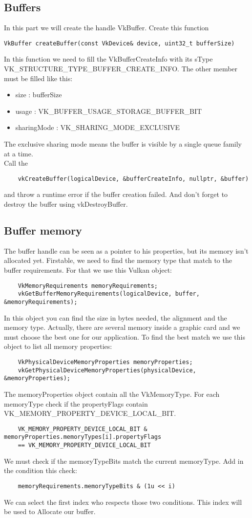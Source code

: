 \documentclass{article}
\begin{document}
\subsection{Buffers}
In this part we will create the handle VkBuffer. Create this function 
\begin{lstlisting}
VkBuffer createBuffer(const VkDevice& device, uint32_t bufferSize)
\end{lstlisting}
In this function we need to fill the VkBufferCreateInfo with its sType VK\_STRUCTURE\_TYPE\_BUFFER\_CREATE\_INFO. The other member must be filled like this:
\begin{itemize}
	\item size : bufferSize
	\item usage : VK\_BUFFER\_USAGE\_STORAGE\_BUFFER\_BIT
	\item sharingMode : VK\_SHARING\_MODE\_EXCLUSIVE
\end{itemize}
The exclusive sharing mode means the buffer is visible by a single queue family at a time.\\
Call the
\begin{lstlisting}
	vkCreateBuffer(logicalDevice, &bufferCreateInfo, nullptr, &buffer)
\end{lstlisting}
and throw a runtime error if the buffer creation failed. And don't forget to destroy the buffer using vkDestroyBuffer.

\subsection{Buffer memory}
The buffer handle can be seen as a pointer to his properties, but its memory isn't allocated yet. Firstable, we need to find the memory type that match to the buffer requirements. For that we use this Vulkan object:
\begin{lstlisting}
	VkMemoryRequirements memoryRequirements;
	vkGetBufferMemoryRequirements(logicalDevice, buffer, &memoryRequirements);
\end{lstlisting}
In this object you can find the size in bytes needed, the alignment and the memory type. Actually, there are several memory inside a graphic card and we must choose the best one for our application. To find the best match we use this object to list all memory properties:
\begin{lstlisting}
	VkPhysicalDeviceMemoryProperties memoryProperties;
	vkGetPhysicalDeviceMemoryProperties(physicalDevice, &memoryProperties);
\end{lstlisting}
The memoryProperties object contain all the VkMemoryType. For each memoryType check if the propertyFlags contain VK\_MEMORY\_PROPERTY\_DEVICE\_LOCAL\_BIT.
\begin{lstlisting}
	VK_MEMORY_PROPERTY_DEVICE_LOCAL_BIT & memoryProperties.memoryTypes[i].propertyFlags
	== VK_MEMORY_PROPERTY_DEVICE_LOCAL_BIT
\end{lstlisting}
We must check if the memoryTypeBits match the current memoryType. Add in the condition this check:
\begin{lstlisting}
	memoryRequirements.memoryTypeBits & (1u << i)
\end{lstlisting}
We can select the first index who respects those two conditions. This index will be used to Allocate our buffer.
\end{document}
